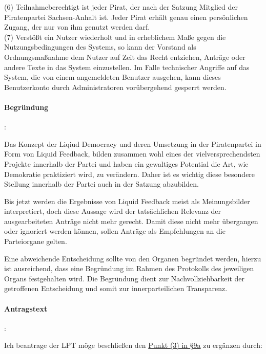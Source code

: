 {(6) Teilnahmeberechtigt ist jeder Pirat, der nach der Satzung Mitglied der Piratenpartei Sachsen-Anhalt ist. Jeder Pirat erhält genau einen persönlichen Zugang, der nur von ihm genutzt werden darf.\\
(7) Verstößt ein Nutzer wiederholt und in erheblichem Maße gegen die Nutzungsbedingungen des Systems, so kann der Vorstand als Ordnungsmaßnahme dem Nutzer auf Zeit das Recht entziehen, Anträge oder andere Texte in das System einzustellen. Im Falle technischer Angriffe auf das System, die von einem angemeldeten Benutzer ausgehen, kann dieses Benutzerkonto durch Administratoren vorübergehend gesperrt werden.}

\paragraph{Begründung}:

Das Konzept der Liqiud Democracy und deren Umsetzung in der Piratenpartei in Form von Liquid Feedback, bilden zusammen wohl eines der vielversprechendsten Projekte innerhalb der Partei und haben ein gewaltiges Potential die Art, wie Demokratie praktiziert wird, zu verändern. Daher ist es wichtig diese besondere Stellung innerhalb der Partei auch in der Satzung abzubilden.

Bis jetzt werden die Ergebnisse von Liquid Feedback meist als Meinungsbilder interpretiert, doch diese Aussage wird der tatsächlichen Relevanz der ausgearbeiteten Anträge nicht mehr gerecht. Damit diese nicht mehr übergangen oder ignoriert werden können, sollen Anträge als Empfehlungen an die Parteiorgane gelten.

Eine abweichende Entscheidung sollte von den Organen begründet werden, hierzu ist ausreichend, dass eine Begründung im Rahmen des Protokolls des jeweiligen Organs festgehalten wird. Die Begründung dient zur Nachvollziehbarkeit der getroffenen Entscheidung und somit zur innerparteilichen Transparenz.



\paragraph{Antragstext}:

Ich beantrage der LPT möge beschließen den \href{http://wiki.piratenpartei.de/LSA:Satzung#.C2.A7_9a_-_Der_Vorstand}{Punkt (3) in §9a} zu ergänzen durch: 

